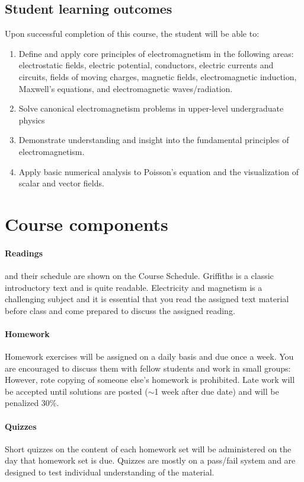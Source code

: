 \documentclass{syllabus}
\begin{document}
\subsection*{Student learning outcomes} 

\noindent
Upon successful completion of this course, the student will be able to:
\begin{enumerate}[label=\textcolor{CarthageDark}{\bfseries\arabic*.}]
    \item Define and apply core principles of electromagnetism in the following areas: electrostatic fields, electric potential, conductors, electric currents and circuits, fields of moving charges, magnetic fields, electromagnetic induction, Maxwell’s equations, and electromagnetic waves/radiation.
    \item Solve canonical electromagnetism problems in upper-level undergraduate physics
\item Demonstrate understanding and insight into the fundamental principles of electromagnetism.
\item Apply basic numerical analysis to Poisson's equation and the visualization of scalar and vector fields.

\end{enumerate}


\section{Course components}
\paragraph*{Readings}
and their schedule are shown on the Course Schedule. Griffiths is a classic introductory text and is quite readable. Electricity and magnetism is a challenging subject and it is essential that you read the assigned text material before class and come prepared to discuss the assigned reading.

\paragraph{Homework} 
Homework exercises will be assigned on a daily basis and due once a week. You are encouraged to discuss them with fellow students and work in small groups: However, rote copying of someone else’s homework is prohibited. Late work will be accepted until solutions are posted ($\sim$1 week after due date) and will be penalized 30\%. 

\paragraph{Quizzes} 
Short quizzes on the content of each homework set will be administered on the day that homework set is due. Quizzes are mostly on a pass/fail system and are designed to test individual understanding of the material. 
\end{document}
